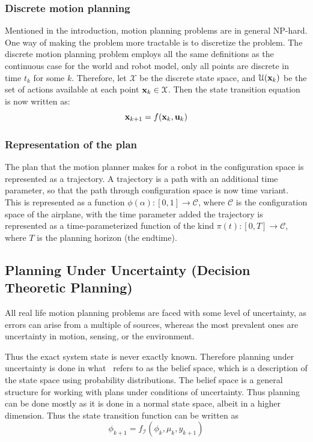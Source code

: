 \subsubsection{Discrete motion planning}

Mentioned in the introduction, motion planning problems are in general NP-hard.
One way of making the problem more tractable is to discretize the problem. The
discrete motion planning problem employs all the same definitions as the
continuous case for the world and robot model, only all points are discrete in
time \(t_k\) for some \(k\). Therefore, let \(\mathcal{X}\) be the discrete
state space, and \(\mathcal{U}(\mathbf{x}_k)\) be the set of actions available at
each point \(\mathbf{x}_k \in \mathcal{X}\). Then the state transition equation is
now written as:
\[
  \mathbf{x}_{k+1} = f(\mathbf{x}_k, \mathbf{u}_k)
\]

\subsubsection{Representation of the plan}

The plan that the motion planner makes for a robot in the configuration space is
represented as a trajectory. A trajectory is a path with an additional time
parameter, so that the path through configuration space is now time variant.
This is represented as a function \(\phi(\alpha) \colon [0,1] \rightarrow
\mathcal{C}\), where \(\mathcal{C}\) is the configuration space of the airplane,
with the time parameter added the trajectory is represented as a
time-parameterized function of the kind \(\pi(t) \colon [0,T] \rightarrow
\mathcal{C}\), where \(T\) is the planning horizon (\ie the endtime).

\subsection{Planning Under Uncertainty (Decision Theoretic Planning)}

All real life motion planning problems are faced with some level of uncertainty,
as errors can arise from a multiple of sources, whereas the most prevalent ones
are uncertainty in motion, sensing, or the environment.

Thus the exact system state is never exactly known. Therefore planning under
uncertainty is done in what~\cite[LaValle]{Lav06} refers to as the belief space,
which is a description of the state space using probability distributions. The
belief space is a general structure for working with plans under conditions of
uncertainty. Thus planning can be done mostly as it is done in a normal state
space, albeit in a higher dimension. Thus the state transition function can be
written as
\[
  \phi_{k+1} = f_{\mathcal{I}}\left( \phi_k, \mu_k, y_{k+1} \right)
\]

